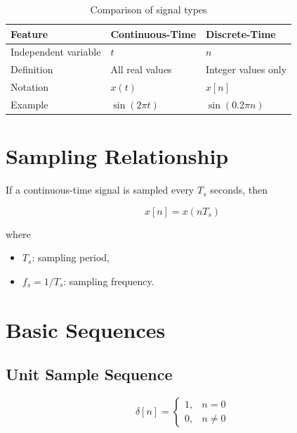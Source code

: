 \begin{table}[H]
\centering
\caption{Comparison of signal types}
\begin{tabular}{|p{4cm}|p{4cm}|p{4cm}|}
\hline
\textbf{Feature} & \textbf{Continuous-Time} & \textbf{Discrete-Time}\\
\hline
Independent variable & \(t\) & \(n\)\\
\hline
Definition & All real values & Integer values only\\
\hline
Notation & \(x(t)\) & \(x[n]\)\\
\hline
Example & \(\sin(2\pi t)\) & \(\sin(0.2\pi n)\)\\
\hline
\end{tabular}
\end{table}


\section{Sampling Relationship}

If a continuous-time signal is sampled every \(T_s\) seconds, then

\[
\boxed{
x[n]=x(nT_s)
}
\]

where

\begin{itemize}
\item \(T_s\): sampling period,
\item \(f_s=1/T_s\): sampling frequency.
\end{itemize}


\section{Basic Sequences}


\subsection{Unit Sample Sequence}

\[
\boxed{
\delta[n]=
\begin{cases}
1, & n=0\\
0, & n\neq0
\end{cases}
}
\]

